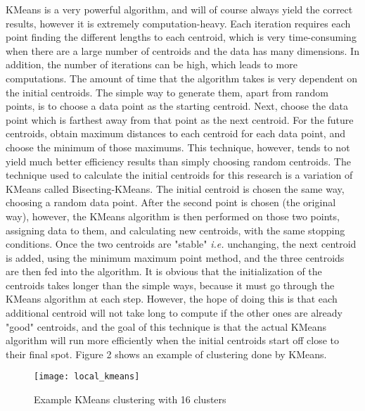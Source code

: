 \documentclass[journal]{IEEEtran}
\begin{document}
KMeans is a very powerful algorithm, and will of course always yield the correct results, however it is extremely computation-heavy. Each iteration requires each point finding the different lengths to each centroid, which is very time-consuming when there are a large number of centroids and the data has many dimensions. In addition, the number of iterations can be high, which leads to more computations. The amount of time that the algorithm takes is very dependent on the initial centroids. The simple way to generate them, apart from random points, is to choose a data point as the starting centroid. Next, choose the data point which is farthest away from that point as the next centroid. For the future centroids, obtain maximum distances to each centroid for each data point, and choose the minimum of those maximums. This technique, however, tends to not yield much better efficiency results than simply choosing random centroids. The technique used to calculate the initial centroids for this research is a variation of KMeans called Bisecting-KMeans. The initial centroid is chosen the same way, choosing a random data point. After the second point is chosen (the original way), however, the KMeans algorithm is then performed on those two points, assigning data to them, and calculating new centroids, with the same stopping conditions. Once the two centroids are "stable" \textit{i.e.} unchanging, the next centroid is added, using the minimum maximum point method, and the three centroids are then fed into the algorithm. It is obvious that the initialization of the centroids takes longer than the simple ways, because it must go through the KMeans algorithm at each step. However, the hope of doing this is that each additional centroid will not take long to compute if the other ones are already "good" centroids, and the goal of this technique is that the actual KMeans algorithm will run more efficiently when the initial centroids start off close to their final spot. Figure 2 shows an example of clustering done by KMeans.
\begin{figure}[t]
	\caption{Example KMeans clustering with 16 clusters}
	\texttt{[image: local\_kmeans]}
\end{figure}

\end{document}

